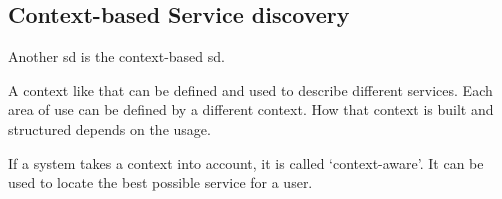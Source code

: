 \subsection{Context-based Service discovery}\label{sec:contextsd}

Another \gls{sd} is the context-based \gls{sd}.


A context like that can be defined and used to describe different services. Each area of use can be defined by a different context. How that context is built and structured depends on the usage.

If a system takes a context into account, it is called \enquote*{context-aware}. It can be used to locate the best possible service for a user.
